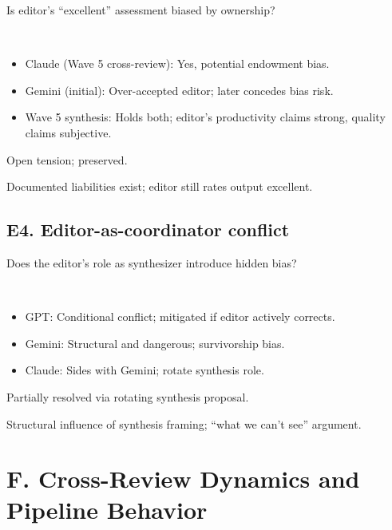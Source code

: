 \documentclass[11pt,letterpaper]{article}
\begin{document}
\begin{reflist}
\item[Dispute:] Is editor's ``excellent'' assessment biased by ownership?
\item[Positions:]~
  \begin{itemize}[nosep]
    \item Claude (Wave 5 cross-review): Yes, potential endowment bias.
    \item Gemini (initial): Over-accepted editor; later concedes bias risk.
    \item Wave 5 synthesis: Holds both; editor's productivity claims strong, quality claims subjective.
  \end{itemize}
\item[Status:] Open tension; preserved.
\item[Evidence:] Documented liabilities exist; editor still rates output excellent.
\end{reflist}

\subsection{E4. Editor-as-coordinator conflict}

\begin{reflist}
\item[Dispute:] Does the editor's role as synthesizer introduce hidden bias?
\item[Positions:]~
  \begin{itemize}[nosep]
    \item GPT: Conditional conflict; mitigated if editor actively corrects.
    \item Gemini: Structural and dangerous; survivorship bias.
    \item Claude: Sides with Gemini; rotate synthesis role.
  \end{itemize}
\item[Status:] Partially resolved via rotating synthesis proposal.
\item[Evidence:] Structural influence of synthesis framing; ``what we can't see'' argument.
\end{reflist}

\section{F. Cross-Review Dynamics and Pipeline Behavior}
\end{document}
